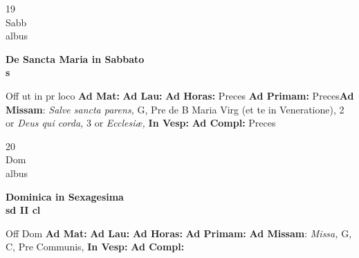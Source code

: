 \documentclass[10pt, openany]{book}
\begin{document}
    \begin{center}
        \begin{minipage}{3.5in}
            \vspace{2em}
            \begin{minipage}{0.5in}
                {\Huge 19} \\
                {\normalsize Sabb} \\
                {\normalsize albus}
            \end{minipage}
            \begin{minipage}{3.0in}
                \textbf{ \large De Sancta Maria in Sabbato \\
                \textnormal{\normalsize s}} \\ 
            \end{minipage}
            \begin{justify}Off ut in pr loco
                \textbf{Ad Mat: }
                \textbf{Ad Lau: }
                \textbf{Ad Horas: }Preces
                \textbf{Ad Primam: }Preces\textbf{Ad Missam}: \textit{Salve sancta parens,} G, Pre de B Maria Virg (et te in Veneratione), 2 or \textit{Deus qui corda,} 3 or \textit{Ecclesiæ,}  
                \textbf{In Vesp: }
                \textbf{Ad Compl: }Preces
            \end{justify}
        \end{minipage}
    \end{center}

    \begin{center}
        \begin{minipage}{3.5in}
            \vspace{2em}
            \begin{minipage}{0.5in}
                {\Huge 20} \\
                {\normalsize Dom} \\
                {\normalsize albus}
            \end{minipage}
            \begin{minipage}{3.0in}
                \textbf{ \large Dominica in Sexagesima \\
                \textnormal{\normalsize sd II cl}} \\ 
            \end{minipage}
            \begin{justify}Off Dom
                \textbf{Ad Mat: }
                \textbf{Ad Lau: }
                \textbf{Ad Horas: }
                \textbf{Ad Primam: }\textbf{Ad Missam}: \textit{Missa,} G, C, Pre Communis,  
                \textbf{In Vesp: }
                \textbf{Ad Compl: }
            \end{justify}
        \end{minipage}
    \end{center}
\end{document}

